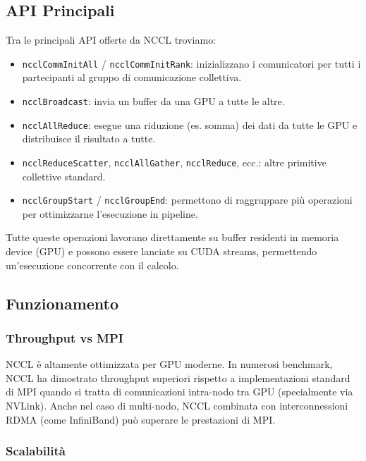 \documentclass[a4paper]{article}
\begin{document}
\subsection{API Principali}
Tra le principali API offerte da NCCL troviamo:\\

\begin{itemize}
  \item \texttt{ncclCommInitAll} / \texttt{ncclCommInitRank}: inizializzano i comunicatori per tutti i partecipanti al gruppo di comunicazione collettiva.
  \item \texttt{ncclBroadcast}: invia un buffer da una GPU a tutte le altre.
  \item \texttt{ncclAllReduce}: esegue una riduzione (es. somma) dei dati da tutte le GPU e distribuisce il risultato a tutte.
  \item \texttt{ncclReduceScatter}, \texttt{ncclAllGather}, \texttt{ncclReduce}, ecc.: altre primitive collettive standard.
  \item \texttt{ncclGroupStart} / \texttt{ncclGroupEnd}: permettono di raggruppare più operazioni per ottimizzarne l’esecuzione in pipeline.
\end{itemize}

Tutte queste operazioni lavorano direttamente su buffer residenti in memoria device (GPU) e possono essere lanciate su CUDA streams, permettendo un'esecuzione concorrente con il calcolo.

\subsection{Funzionamento}

\subsubsection{Throughput vs MPI}

NCCL è altamente ottimizzata per GPU moderne. In numerosi benchmark, NCCL ha dimostrato throughput superiori rispetto a implementazioni standard di MPI quando si tratta di comunicazioni intra-nodo tra GPU (specialmente via NVLink). Anche nel caso di multi-nodo, NCCL combinata con interconnessioni RDMA (come InfiniBand) può superare le prestazioni di MPI.

\subsubsection{Scalabilità}
\end{document}

